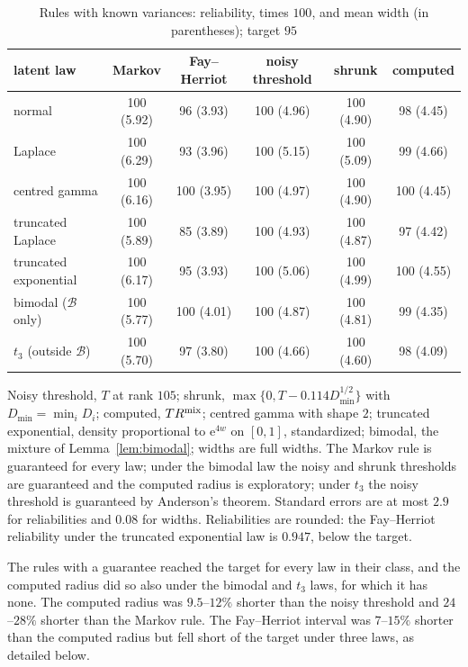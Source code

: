 \documentclass[11pt]{article}
\renewcommand{\_}{\usc\allowbreak}
\begin{document}
\begin{table}[h]
\centering
\caption{Rules with known variances: reliability, times $100$, and mean width (in parentheses); target $95$}
\label{tab:synth}
\small
\begin{tabular}{lccccc}
\toprule
latent law & Markov & Fay--Herriot & noisy threshold & shrunk & computed \\
\midrule
normal & 100 (5.92) & 96 (3.93) & 100 (4.96) & 100 (4.90) & 98 (4.45) \\
Laplace & 100 (6.29) & 93 (3.96) & 100 (5.15) & 100 (5.09) & 99 (4.66) \\
centred gamma & 100 (6.16) & 100 (3.95) & 100 (4.97) & 100 (4.90) & 100 (4.45) \\
truncated Laplace & 100 (5.89) & 85 (3.89) & 100 (4.93) & 100 (4.87) & 97 (4.42) \\
truncated exponential & 100 (6.17) & 95 (3.93) & 100 (5.06) & 100 (4.99) & 100 (4.55) \\
bimodal ($\mathcal B$ only) & 100 (5.77) & 100 (4.01) & 100 (4.87) & 100 (4.81) & 99 (4.35) \\
$t_3$ (outside $\mathcal B$) & 100 (5.70) & 97 (3.80) & 100 (4.66) & 100 (4.60) & 98 (4.09) \\
\bottomrule
\end{tabular}

\medskip
\parbox{0.95\textwidth}{\footnotesize Noisy threshold, $T$ at rank $105$; shrunk, $\max\{0, T - 0.114D_{\min}^{1/2}\}$ with $D_{\min} = \min_i D_i$; computed, $T R^{\rm mix}$; centred gamma with shape $2$; truncated exponential, density proportional to $\mathrm{e}^{4w}$ on $[0,1]$, standardized; bimodal, the mixture of Lemma~\ref{lem:bimodal}; widths are full widths. The Markov rule is guaranteed for every law; under the bimodal law the noisy and shrunk thresholds are guaranteed and the computed radius is exploratory; under $t_3$ the noisy threshold is guaranteed by Anderson's theorem. Standard errors are at most $2.9$ for reliabilities and $0.08$ for widths. Reliabilities are rounded: the Fay--Herriot reliability under the truncated exponential law is $0.947$, below the target.}
\end{table}

The rules with a guarantee reached the target for every law in their class, and the computed radius did so also under the bimodal and $t_3$ laws, for which it has none. The computed radius was $9.5$--$12\%$ shorter than the noisy threshold and $24$--$28\%$ shorter than the Markov rule. The Fay--Herriot interval was $7$--$15\%$ shorter than the computed radius but fell short of the target under three laws, as detailed below.
\end{document}
